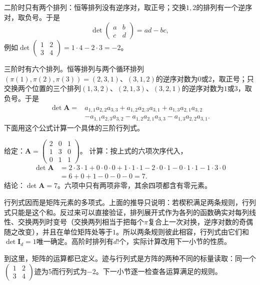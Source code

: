二阶时只有两个排列：恒等排列没有逆序对，取正号；交换$1,2$的排列有一个逆序对，取负号。于是
\[
 \det\begin{pmatrix}a&b\\c&d\end{pmatrix}=ad-bc,
\]
例如$\det\left(\begin{smallmatrix}1&2\\3&4\end{smallmatrix}\right)=1\cdot4-2\cdot3=-2$。

三阶时有六个排列。恒等排列与两个循环排列$(\pi(1),\pi(2),\pi(3))=(2,3,1)$、$(3,1,2)$的逆序对数为$0$或$2$，取正号；只交换两个位置的三个排列$(1,3,2)$、$(2,1,3)$、$(3,2,1)$的逆序对数为$1$或$3$，取负号。于是
\[
 \begin{aligned}
 \det\bm A={}&a_{1,1}a_{2,2}a_{3,3}+a_{1,2}a_{2,3}a_{3,1}+a_{1,3}a_{2,1}a_{3,2}\\
 &-a_{1,1}a_{2,3}a_{3,2}-a_{1,2}a_{2,1}a_{3,3}-a_{1,3}a_{2,2}a_{3,1}.
 \end{aligned}
\]
下面用这个公式计算一个具体的三阶行列式。
\begin{example}[三阶行列式的排列展开]
\label{ex:ls-det-three-by-three}
给定：$\bm A=\left(\begin{smallmatrix}2&0&1\\1&3&0\\0&1&1\end{smallmatrix}\right)$。
计算：按上式的六项次序代入，
\[
 \begin{aligned}
 \det\bm A&=2\cdot3\cdot1+0\cdot0\cdot0+1\cdot1\cdot1-2\cdot0\cdot1-0\cdot1\cdot1-1\cdot3\cdot0\\
 &=6+0+1-0-0-0=7.
 \end{aligned}
\]
结论：$\det\bm A=7$。六项中只有两项非零，其余四项都含有零元素。
\end{example}

行列式因而是矩阵元素的多项式。上面的推导只说明：若楔积满足两条规则，行列式只能是这个和。反过来可以直接验证，排列展开式作为各列的函数确实对每列线性、交换两列时变号（交换两列相当于把每个$\pi$复合上一次对换，逆序对数的奇偶随之改变），并且在单位矩阵处等于$1$。所以两条规则彼此相容，行列式由它们和$\det\bm I_d=1$唯一确定。高阶时排列有$d!$个，实际计算改用下一小节的性质。

到这里，矩阵的运算都已定义。迹与行列式是方阵的两种不同的标量读取：同一个$\left(\begin{smallmatrix}1&2\\3&4\end{smallmatrix}\right)$迹为$5$而行列式为$-2$。下一小节逐一检查各运算满足的规则。
